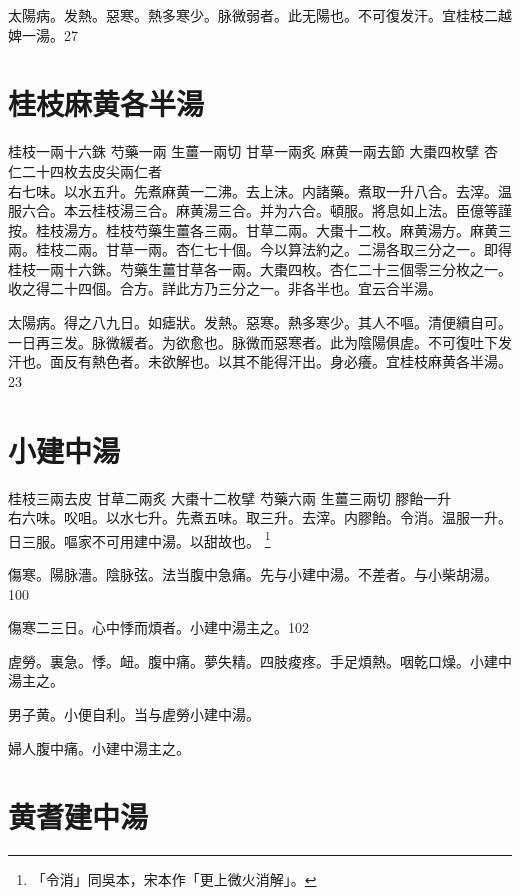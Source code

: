 太陽病。发熱。惡寒。熱多寒少。脉微弱者。此无陽也。不可{\khaaitp 復}发汗。{\khaaitp 宜桂枝二越婢一湯。}27

\section{桂枝麻黄各半湯}

桂枝{\scriptsize 一兩十六銖} 芍藥{\scriptsize 一兩} 生薑{\scriptsize 一兩切} 甘草{\scriptsize 一兩炙} 麻黄{\scriptsize 一兩去節} 大棗{\scriptsize 四枚擘} 杏仁{\scriptsize 二十四枚去皮尖兩仁者}\\
右七味。以水五升。先煮麻黄一二沸。去上沫。内諸藥。煮取一升八合。去滓。温服六合。本云桂枝湯三合。麻黄湯三合。并为六合。頓服。將息如上法。{\scriptsize 臣億等謹按。桂枝湯方。桂枝芍藥生薑各三兩。甘草二兩。大棗十二枚。麻黄湯方。麻黄三兩。桂枝二兩。甘草一兩。杏仁七十個。今以算法約之。二湯各取三分之一。即得桂枝一兩十六銖。芍藥生薑甘草各一兩。大棗四枚。杏仁二十三個零三分枚之一。收之得二十四個。合方。詳此方乃三分之一。非各半也。宜云合半湯。}

太陽病。得之八九日。如瘧狀。发熱。惡寒。熱多寒少。其人不嘔。清便續自可。一日再三发。脉微緩者。为欲愈也。脉微而惡寒者。此为陰陽俱虗。不可復{\khaaitp 吐下}发汗也。面反有熱色者。未欲解也。以其不能得汗出。身必癢。宜桂枝麻黄各半湯。23

\section{小建中湯}

桂枝{\scriptsize 三兩去皮} 甘草{\scriptsize 二兩炙} 大棗{\scriptsize 十二枚擘} 芍藥{\scriptsize 六兩} 生薑{\scriptsize 三兩切} 膠飴{\scriptsize 一升}\\
右六味。{\khaaitp 㕮咀。}以水七升。{\khaaitp 先}煮{\khaaitp 五味。}取三升。去滓。内{\khaaitp 膠}飴。令消。温服一升。日三服。嘔家不可用建中湯。以甜故也。
	\footnote{
		「令消」同吳本，宋本作「更上微火消解」。
	}

傷寒。陽脉濇。陰脉弦。法当腹中急痛。先与小建中湯。不差者。与小柴胡湯。100

傷寒二三日。心中悸而煩者。小建中湯主之。102

虗勞。裏急。悸。衄。腹中痛。夢失精。四肢痠疼。手足煩熱。咽乾口燥。小建中湯主之。

男子黄。小便自利。当与虗勞小建中湯。

婦人腹中痛。小建中湯主之。

\section{黄耆建中湯}

